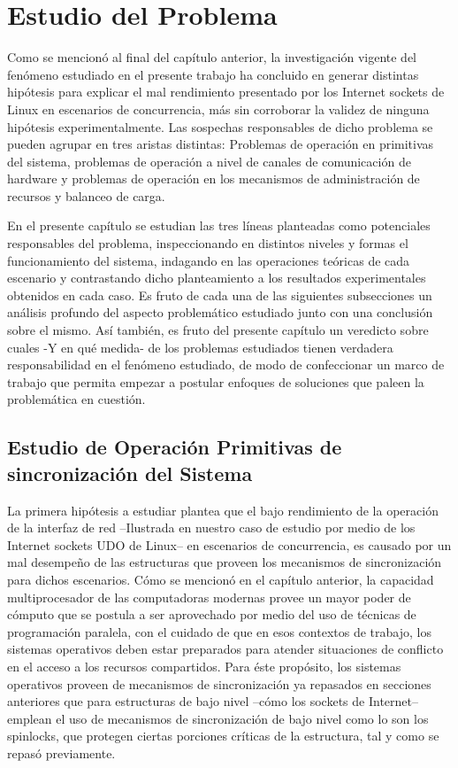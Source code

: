 \chapter{Estudio del Problema}

Como se mencionó al final del capítulo anterior, la investigación vigente del fenómeno estudiado en el presente trabajo ha concluido en generar distintas hipótesis para explicar el mal rendimiento presentado por los Internet sockets de Linux en escenarios de concurrencia, más sin corroborar la validez de ninguna hipótesis experimentalmente. Las sospechas responsables de dicho problema se pueden agrupar en tres aristas distintas: Problemas de operación en primitivas del sistema, problemas de operación a nivel de canales de comunicación de hardware y problemas de operación en los mecanismos de administración de recursos y balanceo de carga.

En el presente capítulo se estudian las tres líneas planteadas como potenciales responsables del problema, inspeccionando en distintos niveles y formas el funcionamiento del sistema, indagando en las operaciones teóricas de cada escenario y contrastando dicho planteamiento a los resultados experimentales obtenidos en cada caso. Es fruto de cada una de las siguientes subsecciones un análisis profundo del aspecto problemático estudiado junto con una conclusión sobre el mismo. Así también, es fruto del presente capítulo un veredicto sobre cuales -Y en qué medida- de los problemas estudiados tienen verdadera responsabilidad en el fenómeno estudiado, de modo de confeccionar un marco de trabajo que permita empezar a postular enfoques de soluciones que paleen la problemática en cuestión.

\section{Estudio de Operación Primitivas de sincronización del Sistema}

La primera hipótesis a estudiar plantea que el bajo rendimiento de la operación de la interfaz de red --Ilustrada en nuestro caso de estudio por medio de los Internet sockets UDO de Linux-- en escenarios de concurrencia, es causado por un mal desempeño de las estructuras que proveen los mecanismos de sincronización para dichos escenarios. Cómo se mencionó en el capítulo anterior, la capacidad multiprocesador de las computadoras modernas provee un mayor poder de cómputo que se postula a ser aprovechado por medio del uso de técnicas de programación paralela, con el cuidado de que en esos contextos de trabajo, los sistemas operativos deben estar preparados para atender situaciones de conflicto en el acceso a los recursos compartidos. Para éste propósito, los sistemas operativos proveen de mecanismos de sincronización ya repasados en secciones anteriores que para estructuras de bajo nivel --cómo los sockets de Internet-- emplean el uso de mecanismos de sincronización de bajo nivel como lo son los spinlocks, que protegen ciertas porciones críticas de la estructura, tal y como se repasó previamente.

